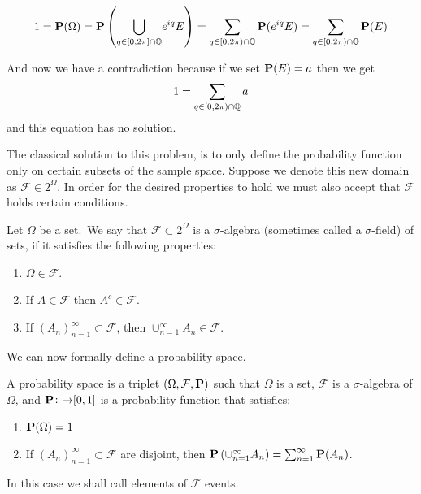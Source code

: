 \documentclass[11pt,a4paper]{article}
\begin{document}
  \[
    1 = \mathbf{P}(\Omega) = 
    \mathbf{P}\left({\bigcup_{q \in [0,2\pi] \cap \mathbb{Q}}}{e^{i q} E}\right) = 
    \sum_{q \in [0,2\pi) \cap \mathbb{Q}}{\mathbf{P}(e^{i q} E)} = 
    \sum_{q \in [0,2\pi) \cap \mathbb{Q}}{\mathbf{P}(E)}
  \]

  And now we have a contradiction because if we set $\mathbf{P}(E) = a$ then
  we get
  \[ 1 = \sum_{q \in [0,2\pi) \cap \mathbb{Q}}{a} \]
  and this equation has no solution.

  The classical solution to this problem, is to only define the probability
  function only on certain subsets of the sample space. Suppose we denote
  this new domain as $\mathcal F \in 2^\Omega$. In order for the desired
  properties to hold we must also accept that $\mathcal F$ holds certain
  conditions.

  \begin{definition}
    Let $\Omega$ be a set.\ We say that $\mathcal F \subset 2^\Omega$ is a
    $\sigma$-algebra (sometimes called a $\sigma$-field) of sets, if it
    satisfies the following properties:
    \begin{enumerate}
      \item $\Omega \in \mathcal F$.
      \item If $A \in \mathcal F$ then $A^c \in \mathcal F$.
      \item If $(A_n)_{n=1}^{\infty} \subset \mathcal F$, then
        $\cup_{n=1}^{\infty}{A_n} \in \mathcal F$.
    \end{enumerate}
  \end{definition}

  We can now formally define a probability space.

  \begin{definition}
    A probability space is a triplet $(\Omega, \mathcal F, \mathbf{P})$ such
    that $\Omega$ is a set, $\mathcal F$ is a $\sigma$-algebra of $\Omega$,
    and $\mathbf{P} \colon \mathcal \to [0,1]$ is a probability function that
    satisfies:
    \begin{enumerate}
      \item $\mathbf{P}(\Omega) = 1$
      \item If $(A_n)_{n=1}^{\infty} \subset \mathcal F$ are disjoint, then
        $\mathbf{P}\left(\cup_{n=1}^{\infty}{A_n}\right) = 
        \sum_{n=1}^{\infty}{\mathbf{P}(A_n)}$.
    \end{enumerate}
  \end{definition}

  In this case we shall call elements of $\mathcal F$ events.
\end{document}
